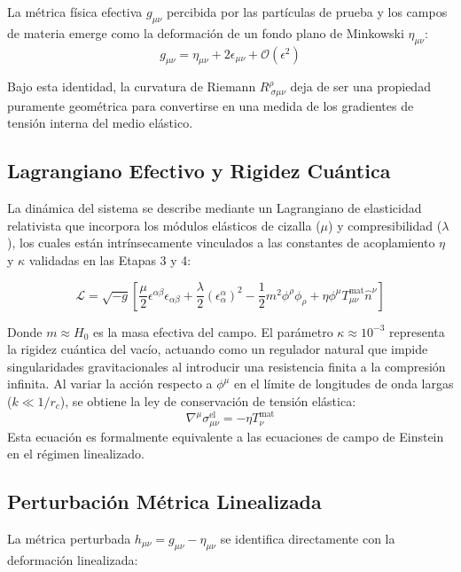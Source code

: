 \documentclass[11pt,a4paper]{article}
\begin{document}
La métrica física efectiva $g_{\mu\nu}$ percibida por las partículas de prueba y los campos de materia emerge como la deformación de un fondo plano de Minkowski $\eta_{\mu\nu}$:
\begin{equation}
	\boxed{g_{\mu\nu} = \eta_{\mu\nu} + 2 \epsilon_{\mu\nu} + \mathcal{O}(\epsilon^2)}
\end{equation}

Bajo esta identidad, la curvatura de Riemann $R^\rho_{\ \sigma\mu\nu}$ deja de ser una propiedad puramente geométrica para convertirse en una medida de los gradientes de tensión interna del medio elástico.

\subsection{Lagrangiano Efectivo y Rigidez Cuántica}
La dinámica del sistema se describe mediante un Lagrangiano de elasticidad relativista que incorpora los módulos elásticos de cizalla ($\mu$) y compresibilidad ($\lambda$), los cuales están intrínsecamente vinculados a las constantes de acoplamiento $\eta$ y $\kappa$ validadas en las Etapas 3 y 4:

\begin{equation}
	\mathcal{L} = \sqrt{-g} \left[ \frac{\mu}{2} \epsilon^{\alpha\beta} \epsilon_{\alpha\beta} + \frac{\lambda}{2} (\epsilon^\alpha_\alpha)^2 - \frac{1}{2} m^2 \phi^\rho \phi_\rho + \eta \phi^\mu T_{\mu\nu}^{\text{mat}} \hat{n}^\nu \right]
\end{equation}

Donde $m \approx H_0$ es la masa efectiva del campo. El parámetro $\kappa \approx 10^{-3}$ representa la rigidez cuántica del vacío, actuando como un regulador natural que impide singularidades gravitacionales al introducir una resistencia finita a la compresión infinita. Al variar la acción respecto a $\phi^\mu$ en el límite de longitudes de onda largas ($k \ll 1/r_c$), se obtiene la ley de conservación de tensión elástica:
\begin{equation}
	\nabla^\mu \sigma_{\mu\nu}^{\text{el}} = - \eta T_\nu^{\text{mat}}
\end{equation}
Esta ecuación es formalmente equivalente a las ecuaciones de campo de Einstein en el régimen linealizado.

\subsection{Perturbación Métrica Linealizada}
La métrica perturbada \( h_{\mu\nu} = g_{\mu\nu} - \eta_{\mu\nu} \) se identifica directamente con la deformación linealizada:
\end{document}
